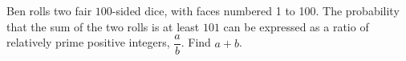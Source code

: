 Ben rolls two fair $100$-sided dice, with faces numbered 1 to 100. The probability that the sum of the two rolls is at least $101$ can be expressed as a ratio of relatively prime positive integers, $\dfrac{a}{b}$. Find $a+b$.
